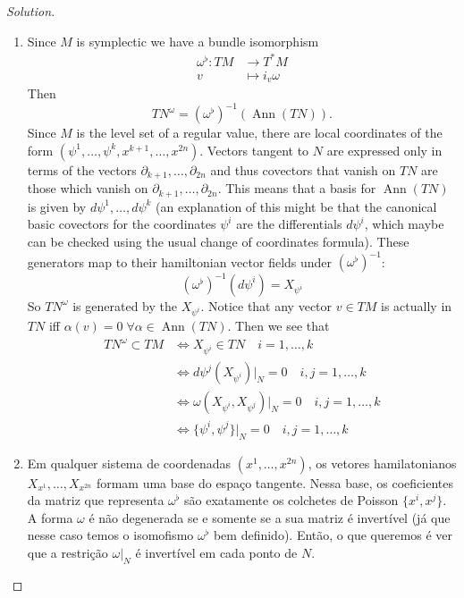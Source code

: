 \begin{proof}[Solution]\leavevmode
	\begin{enumerate}[label=\alph*.]
		\item Since $M$ is symplectic we have a bundle isomorphism
\begin{align*}
	\omega^\flat: TM &\longrightarrow T^*M \\
	v &\longmapsto i_v\omega
\end{align*}
Then 
\[T N^\omega=(\omega^\flat )^{-1}(\operatorname{Ann}(T N)).\]
Since $M$ is the level set of a regular value, there are local coordinates of the form $(\psi^1,\ldots,\psi^k,x^{k+1},\ldots,x^{2n})$. Vectors tangent to $N$ are expressed only in terms of the vectors $\partial_{k+1},\ldots,\partial_{2n}$ and thus covectors that vanish on $T N$ are those which vanish on $\partial_{k+1},\ldots, \partial_{2n}$. This means that a basis for $\operatorname{Ann}(T N)$ is given by $d\psi^1,\ldots,d\psi^k$ (an explanation of this might be that the canonical basic covectors for the coordinates $\psi^i$ are the differentials $d\psi^i$, which maybe can be checked using the usual change of coordinates formula). These generators map to their hamiltonian vector fields under $(\omega^\flat)^{-1}$:
\[\left(\omega^\flat \right)^{-1}(d\psi^i)=X_{\psi^i}\]
So $T N^\omega$ is generated by the $X_{\psi^i}$. Notice that any vector $v \in TM$ is actually in $T N$ iff $\alpha(v)=0\;\forall \alpha\in\operatorname{Ann}(T N) $. Then we see that
\begin{align*}
	T N^\omega\subset TM&\iff X_{\psi^i}\in T N\quad i=1,\ldots,k\\
	&\iff d\psi^j(X_{\psi^i})|_{N}=0 \quad i,j=1,\ldots,k\\
	&\iff \omega(X_{\psi^i},X_{\psi^j})|_{N}=0\quad i,j=1,\ldots,k\\
	&\iff \{\psi^i,\psi^j\}|_{N}=0\quad i,j=1,\ldots,k
\end{align*}

\item Em qualquer sistema de coordenadas $(x^1,\ldots,x^{2n})$, os vetores hamilatonianos $X_{x^1},\ldots,X_{x^{2n}}$ formam uma base do espaço tangente. Nessa base, os coeficientes da matriz que representa $\omega^\flat$ s\~ao exatamente os colchetes de Poisson  $\{x^i,x^j\}$. A forma $\omega$ \'e n\~ao degenerada se e somente se a sua matriz \'e invert\'ivel (j\'a que nesse caso temos o isomofismo $\omega^\flat$ bem definido). Então, o que queremos \'e ver que a restri\c c\~ao $\omega|_{N}$ \'e invert\'ivel em cada ponto de $N$.


\end{enumerate}
\end{proof}
